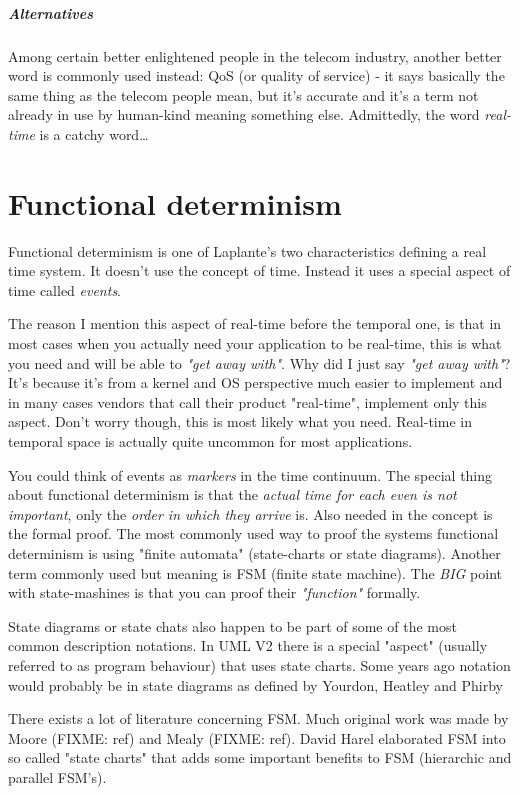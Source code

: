 \paragraph{Alternatives}
Among certain better enlightened people in the telecom industry, another better word is commonly used instead: QoS (or quality of service)  - it says basically the same thing as the telecom people mean, but it's accurate and it's a term not already in use by human-kind meaning something else. Admittedly, the word \textit{real-time} is a catchy word\ldots

\chapter{Functional determinism}
Functional determinism is one of Laplante's two characteristics defining a real time system. It doesn't use the concept of time. Instead it uses a special aspect of time called \textit{events}. 

The reason I mention this aspect of real-time before the temporal one, is that in most cases when you actually need your application to be real-time, this is what you need and will be able to \textit{"get away with"}. Why did I just say \textit{"get away with"}? It's because it's from a kernel and OS perspective much easier to implement and in many cases vendors that call their product "real-time", implement only this aspect. Don't worry though, this is most likely what you need. Real-time in temporal space is actually quite uncommon for most applications.

You could think of events as \textit{markers} in the time continuum. The special thing about functional determinism is that the \textit{actual time for each even is not important}, only the \textit{order in which they arrive} is.
Also needed in the concept is the formal proof. The most commonly used way to proof the systems functional determinism is using "finite automata" (state-charts or state diagrams). Another term commonly used but meaning is FSM (finite state machine). The \textit{BIG} point with state-mashines is that you can proof their \textit{"function"} formally.

State diagrams or state chats also happen to be part of some of the most common description notations. In UML V2 there is a special "aspect" (usually referred to as program behaviour) that uses state charts. Some years ago notation would probably be in state diagrams as defined by Yourdon, Heatley and Phirby 

There exists a lot of literature concerning FSM. Much original work was made by Moore (FIXME: ref) and Mealy (FIXME: ref). David Harel elaborated FSM into so called "state charts" that adds some important benefits to FSM (hierarchic and parallel FSM's).

